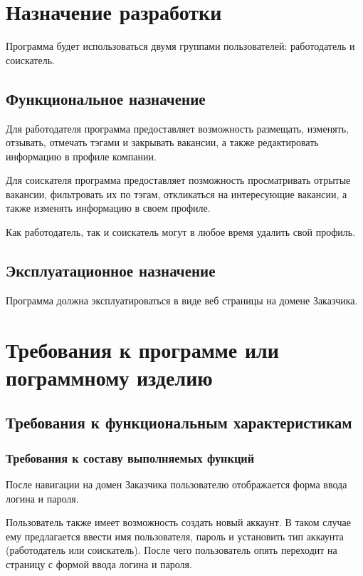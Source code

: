 \documentclass[a4page]{article}
\begin{document}
\section{Назначение разработки}

Программа будет использоваться двумя группами пользователей: работодатель и соискатель.

\subsection{Функциональное назначение}

Для работодателя программа предоставляет возможность размещать, изменять, отзывать, отмечать тэгами и закрывать вакансии, а также редактировать информацию в профиле компании.

Для соискателя программа предоставляет позможность просматривать отрытые вакансии, фильтровать их по тэгам, откликаться на интересующие вакансии, а также изменять информацию в своем профиле.

Как работодатель, так и соискатель могут в любое время удалить свой профиль.

\subsection{Эксплуатационное назначение}

Программа должна эксплуатироваться в виде веб страницы на домене Заказчика.

\section{Требования к программе или пограммному изделию}

\subsection{Требования к функциональным характеристикам}

\subsubsection{Требования к составу выполняемых функций}

После навигации на домен Заказчика пользователю отображается форма ввода логина и пароля.

Пользователь также имеет возможность создать новый аккаунт. В таком случае ему предлагается ввести имя пользователя, пароль и установить тип аккаунта (работодатель или соискатель). После чего пользователь опять переходит на страницу с формой ввода логина и пароля.
\end{document}
